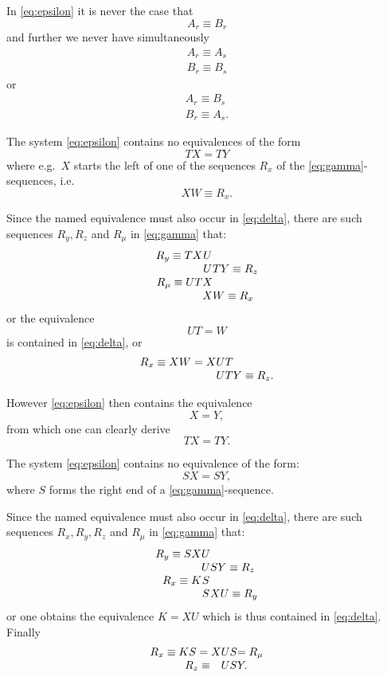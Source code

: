 In \eqref{eq:epsilon} it is never the case that
$$A_r \equiv B_r$$
and further we never have simultaneously
\begin{gather*}
A_r \equiv A_s\\
B_r \equiv B_s
\end{gather*}
or
\begin{gather*}
A_r \equiv B_s\\
B_r \equiv A_s.
\end{gather*}

The system \eqref{eq:epsilon} contains no equivalences of
the form
$$TX = TY$$
where e.g.\ $X$ starts the left of one of the sequences $R_x$ of the
\eqref{eq:gamma}-sequences, i.e.
$$XW \equiv R_x.$$

Since the named equivalence must also occur in \eqref{eq:delta}, there
are such sequences $R_y, R_z$ and $R_\mu$ in \eqref{eq:gamma} that:
$$\begin{array}{r@{}c@{}l}
R_y \equiv TX &U&\\
             &U& TY \equiv R_z\\
R_\mu \equiv UT &X&\\
             &X&W \equiv R_x
\end{array}$$
or the equivalence
$$UT = W$$
is contained in \eqref{eq:delta}, or
$$\begin{array}{r@{}c@{}l}
R_x \equiv XW = X &UT&\\
             &UT& Y \equiv R_z.
\end{array}$$

However \eqref{eq:epsilon} then contains the equivalence
$$X = Y,$$
from which one can clearly derive  
$$TX = TY.$$

The system \eqref{eq:epsilon} contains no equivalence of the
form:
$$SX = SY,$$
where $S$ forms the right end of a  \eqref{eq:gamma}-sequence.

Since the named equivalence must also occur in \eqref{eq:delta}, there
are such sequences $R_x, R_y, R_z$ and $R_\mu$ in \eqref{eq:gamma} that:
$$\begin{array}{r@{}c@{}l}
R_y \equiv SX &U&\\
             &U& SY \equiv R_z\\
R_x \equiv K &S&\\
             &S&XU \equiv R_y
\end{array}$$
or one obtains the equivalence $K = XU$ which is thus contained in
\eqref{eq:delta}.
Finally
$$\begin{array}{r@{}c@{}l}
R_x \equiv KS = X &US& = R_\mu\\
     R_z \equiv \quad &US& Y.
\end{array}$$

